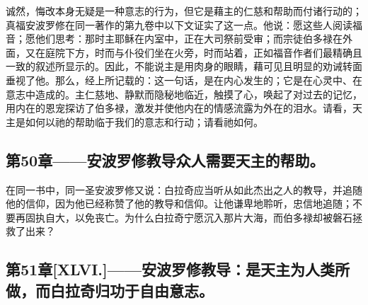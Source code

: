 诚然，悔改本身无疑是一种意志的行为，但它是藉主的仁慈和帮助而付诸行动的；真福安波罗修在同一著作的第九卷中以下文证实了这一点。他说：愿这些人阅读福音；愿他们思考：那时主耶稣在内室中，正在大司祭前受审；而宗徒伯多禄在外面，又在庭院下方，时而与仆役们坐在火旁，时而站着，正如福音作者们最精确且一致的叙述所显示的。因此，不能说主是用肉身的眼睛，藉可见且明显的劝诫转面垂视了他。那么，经上所记载的：这一句话，是在内心发生的；它是在心灵中、在意志中造成的。主仁慈地、静默而隐秘地临近，触摸了心，唤起了对过去的记忆，用内在的恩宠探访了伯多禄，激发并使他内在的情感流露为外在的泪水。请看，天主是如何以祂的帮助临于我们的意志和行动；请看祂如何。\par


\subsection{第50章——安波罗修教导众人需要天主的帮助。}

在同一书中，同一圣安波罗修又说：白拉奇应当听从如此杰出之人的教导，并追随他的信仰，因为他已经称赞了他的教导和信仰。让他谦卑地聆听，忠信地追随；不要再固执自大，以免丧亡。为什么白拉奇宁愿沉入那片大海，而伯多禄却被磐石拯救了出来？\par


\subsection{第51章[XLVI.]——安波罗修教导：是天主为人类所做，而白拉奇归功于自由意志。}

